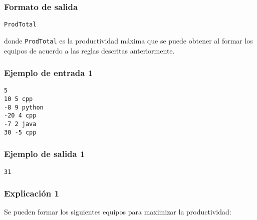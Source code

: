 \subsubsection*{Formato de salida}

\begin{verbatim}
ProdTotal
\end{verbatim}

donde \texttt{ProdTotal} es la productividad máxima que se puede obtener al formar los equipos de acuerdo a las reglas descritas anteriormente.

\subsubsection*{Ejemplo de entrada 1}

\begin{verbatim}
5
10 5 cpp
-8 9 python
-20 4 cpp
-7 2 java
30 -5 cpp
\end{verbatim}

\subsubsection*{Ejemplo de salida 1}

\begin{verbatim}
31
\end{verbatim}

\subsubsection*{Explicación 1}


Se pueden formar los siguientes equipos para maximizar la productividad:

